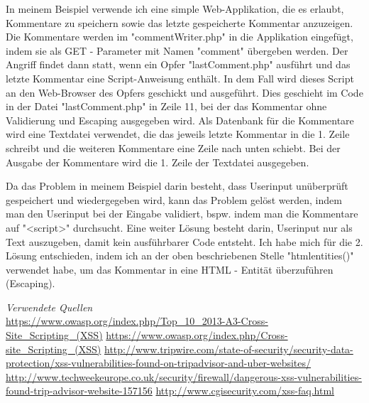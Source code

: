 \documentclass[12pt,a4paper,titlepage,oneside]{scrartcl}
\begin{document}
In meinem Beispiel verwende ich eine simple Web-Applikation, die es erlaubt, Kommentare zu speichern sowie das letzte gespeicherte Kommentar anzuzeigen. Die Kommentare werden im "commentWriter.php" in die Applikation eingefügt, indem sie als GET - Parameter mit Namen "comment" übergeben werden. Der Angriff findet dann statt, wenn ein Opfer "lastComment.php" ausführt und das letzte Kommentar eine Script-Anweisung enthält. In dem Fall wird dieses Script an den Web-Browser des Opfers geschickt und ausgeführt. Dies geschieht im Code in der Datei "lastComment.php" in Zeile 11, bei der das Kommentar ohne Validierung und Escaping ausgegeben wird. Als Datenbank für die Kommentare wird eine Textdatei verwendet, die das jeweils letzte Kommentar in die 1. Zeile schreibt und die weiteren Kommentare eine Zeile nach unten schiebt. Bei der Ausgabe der Kommentare wird die 1. Zeile der Textdatei ausgegeben.

Da das Problem in meinem Beispiel darin besteht, dass Userinput unüberprüft gespeichert und wiedergegeben wird, kann das Problem gelöst werden, indem man den Userinput bei der Eingabe validiert, bspw. indem man die Kommentare auf "<script>" durchsucht. Eine weiter Lösung besteht darin, Userinput nur als Text auszugeben, damit kein ausführbarer Code entsteht. Ich habe mich für die 2. Lösung entschieden, indem ich an der oben beschriebenen Stelle "htmlentities()" verwendet habe, um das Kommentar in eine HTML - Entität überzuführen (Escaping).

\emph{Verwendete Quellen}\\
\url{https://www.owasp.org/index.php/Top_10_2013-A3-Cross-Site_Scripting_(XSS)}
\url{https://www.owasp.org/index.php/Cross-site_Scripting_(XSS)}
\url{http://www.tripwire.com/state-of-security/security-data-protection/xss-vulnerabilities-found-on-tripadvisor-and-uber-websites/}
\url{http://www.techweekeurope.co.uk/security/firewall/dangerous-xss-vulnerabilities-found-trip-advisor-website-157156}
\url{http://www.cgisecurity.com/xss-faq.html}

%
%
\end{document}
